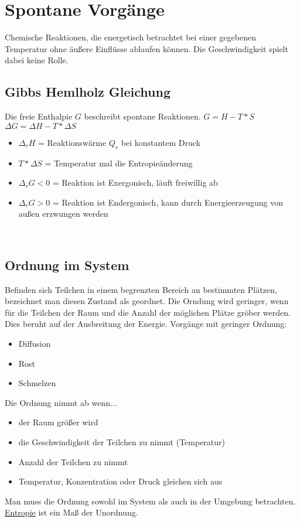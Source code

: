 \section{Spontane Vorgänge} \label{sec:spontane_vorgaenge}
Chemische Reaktionen, die energetisch betrachtet bei einer gegebenen Temperatur ohne äußere Einflüsse ablaufen können.
Die Geschwindigkeit spielt dabei keine Rolle.

\subsection{Gibbs Hemlholz Gleichung}
Die freie Enthalpie $G$ beschreibt spontane Reaktionen. \newline
$G = H - T * S$ 
$\Delta G = \Delta H - T * \Delta S$ 
\begin{itemize}
    \item $\Delta _rH$ = Reaktionswärme $Q_r$ bei konstantem Druck
    \item $T * \Delta S$ = Temperatur mal die Entropieänderung
    \item $\Delta_rG < 0$ = Reaktion ist Exergonisch, läuft freiwillig ab
    \item $\Delta_rG > 0$ = Reaktion ist Endergonisch, kann durch Energieerzeugung von außen erzwungen werden
\end{itemize}
\

\subsection{Ordnung im System}
Befinden sich Teilchen in einem begrenzten Bereich an bestimmten Plätzen, 
bezeichnet man diesen Zustand als geordnet. 
Die Orndung wird geringer,
wenn für die Teilchen der Raum und die Anzahl der möglichen Plätze gröber werden.
Dies beruht auf der Ausbreitung der Energie. \newline
Vorgänge mit geringer Ordnung:
\begin{itemize}
    \item Diffusion
    \item Rost
    \item Schmelzen
\end{itemize}

Die Ordnung nimmt ab wenn...
\begin{itemize}
    \item der Raum größer wird
    \item die Geschwindigkeit der Teilchen zu nimmt (Temperatur)
    \item Anzahl der Teilchen zu nimmt
    \item Temperatur, Konzentration oder Druck gleichen sich aus
\end{itemize}

Man muss die Ordnung sowohl im System als auch in der Umgebung betrachten. 
\hyperref[sec:entropie]{Entropie} ist ein Maß der Unordnung.
